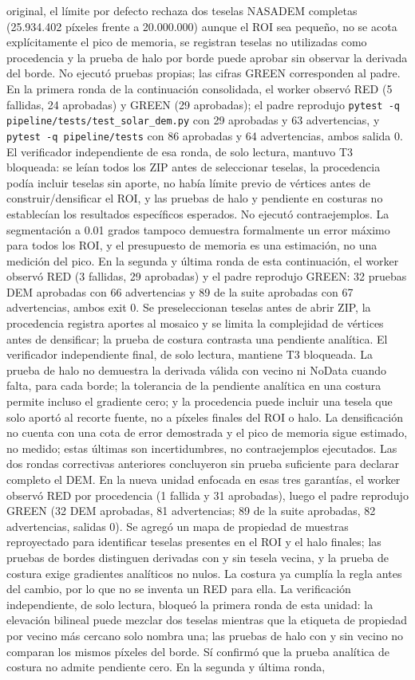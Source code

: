 \documentclass[11pt,a4paper]{article}
\begin{document}
original, el límite por defecto rechaza dos teselas NASADEM completas (25.934.402 píxeles frente a 20.000.000) aunque el ROI sea pequeño, no se acota explícitamente el pico de memoria, se registran teselas no utilizadas como procedencia y la prueba de halo por borde puede aprobar sin observar la derivada del borde. No ejecutó pruebas propias; las cifras GREEN corresponden al padre. En la primera ronda de la continuación consolidada, el worker observó RED (5 fallidas, 24 aprobadas) y GREEN (29 aprobadas); el padre reprodujo \texttt{pytest -q pipeline/tests/test\_solar\_dem.py} con 29 aprobadas y 63 advertencias, y \texttt{pytest -q pipeline/tests} con 86 aprobadas y 64 advertencias, ambos salida 0. El verificador independiente de esa ronda, de solo lectura, mantuvo T3 bloqueada: se leían todos los ZIP antes de seleccionar teselas, la procedencia podía incluir teselas sin aporte, no había límite previo de vértices antes de construir/densificar el ROI, y las pruebas de halo y pendiente en costuras no establecían los resultados específicos esperados. No ejecutó contraejemplos. La segmentación a 0.01 grados tampoco demuestra formalmente un error máximo para todos los ROI, y el presupuesto de memoria es una estimación, no una medición del pico. En la segunda y última ronda de esta continuación, el worker observó RED (3 fallidas, 29 aprobadas) y el padre reprodujo GREEN: 32 pruebas DEM aprobadas con 66 advertencias y 89 de la suite aprobadas con 67 advertencias, ambos exit 0. Se preseleccionan teselas antes de abrir ZIP, la procedencia registra aportes al mosaico y se limita la complejidad de vértices antes de densificar; la prueba de costura contrasta una pendiente analítica. El verificador independiente final, de solo lectura, mantiene T3 bloqueada. La prueba de halo no demuestra la derivada válida con vecino ni NoData cuando falta, para cada borde; la tolerancia de la pendiente analítica en una costura permite incluso el gradiente cero; y la procedencia puede incluir una tesela que solo aportó al recorte fuente, no a píxeles finales del ROI o halo. La densificación no cuenta con una cota de error demostrada y el pico de memoria sigue estimado, no medido; estas últimas son incertidumbres, no contraejemplos ejecutados. Las dos rondas correctivas anteriores concluyeron sin prueba suficiente para declarar completo el DEM. En la nueva unidad enfocada en esas tres garantías, el worker observó RED por procedencia (1 fallida y 31 aprobadas), luego el padre reprodujo GREEN (32 DEM aprobadas, 81 advertencias; 89 de la suite aprobadas, 82 advertencias, salidas 0). Se agregó un mapa de propiedad de muestras reproyectado para identificar teselas presentes en el ROI y el halo finales; las pruebas de bordes distinguen derivadas con y sin tesela vecina, y la prueba de costura exige gradientes analíticos no nulos. La costura ya cumplía la regla antes del cambio, por lo que no se inventa un RED para ella. La verificación independiente, de solo lectura, bloqueó la primera ronda de esta unidad: la elevación bilineal puede mezclar dos teselas mientras que la etiqueta de propiedad por vecino más cercano solo nombra una; las pruebas de halo con y sin vecino no comparan los mismos píxeles del borde. Sí confirmó que la prueba analítica de costura no admite pendiente cero. En la segunda y última ronda, 
\end{document}
